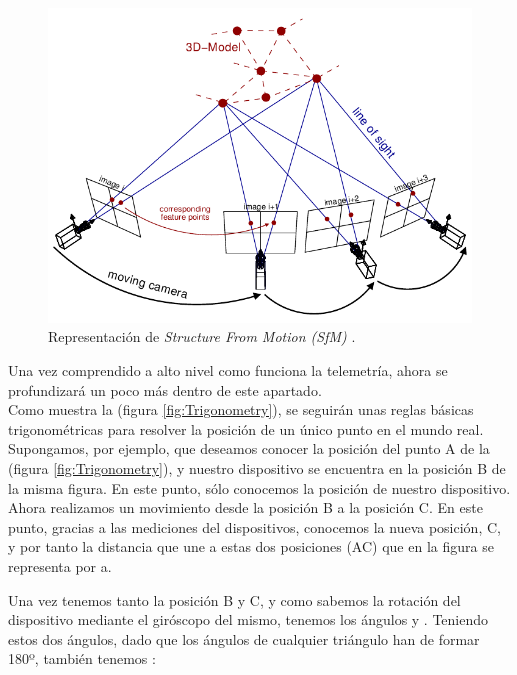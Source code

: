 \begin{figure}[h]
    \centering
    \includegraphics[scale=0.40]{Images/NubeDePuntos/StructureFromMotion(SFM).png}
    \caption[Representación de \textit{Structure From Motion (SfM)}]{Representación de \textit{Structure From Motion (SfM)} \footnotemark.}
    \label{fig:SFM}
\end{figure} 

Una vez comprendido a alto nivel como funciona la telemetría, ahora se profundizará un poco más dentro de este apartado.\\

Como muestra la (figura \ref{fig:Trigonometry}), se seguirán unas reglas básicas trigonométricas para resolver la posición de un único punto en el mundo real. \\

Supongamos, por ejemplo, que deseamos conocer la posición del punto A de la (figura \ref{fig:Trigonometry}), y nuestro dispositivo se encuentra en la posición B de la misma figura.
En este punto, sólo conocemos la posición de nuestro dispositivo.
Ahora realizamos un movimiento desde la posición B a la posición C. En este punto, gracias a las mediciones del dispositivos, conocemos la nueva posición, C, y por tanto la distancia que une a estas dos posiciones (AC) que en la figura se representa por a.

Una vez tenemos tanto la posición B y C, y como sabemos la rotación del dispositivo mediante el giróscopo del mismo, tenemos los ángulos \textbeta y \textgamma. Teniendo estos dos ángulos, dado que los ángulos de cualquier triángulo han de formar 180º, también tenemos \textalpha:

